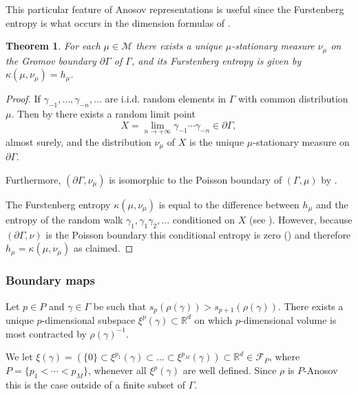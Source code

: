 \documentclass[10pt]{amsart}
\newtheorem{theorem}{Theorem}[section]
\newcommand{\R}{\mathbb{R}}
\newcommand{\F}{\mathcal{F}}
\newcommand{\M}{\mathcal M}
\let\g\gamma
\begin{document}
This particular feature of Anosov representations is useful since the Furstenberg entropy is what occurs in the dimension formulas of \cite{LL23}.


\begin{theorem}\label{furstenberg}
For each \(\mu \in \M\) there exists a unique \(\mu\)-stationary measure \(\nu_\mu\) on the Gromov boundary \(\partial \Gamma\) of \(\Gamma\), and its Furstenberg entropy is given by \(\kappa(\mu,\nu_\mu) = h_\mu\).
\end{theorem}
\begin{proof}
If \(\g_{-1},\ldots, \g_{-n},\ldots\) are i.i.d. random elements in \(\Gamma\) with common distribution \(\mu\). Then by \cite[Th.\,7.6]{Kai00} there exists a random limit point
\[
X = \lim_{n \to +\infty}\g_{-1}\cdots \g_{-n} \in \partial\Gamma,
\]
almost surely, and the distribution \(\nu_\mu\) of \(X\) is the unique \(\mu\)-stationary measure on \(\partial \Gamma\).

Furthermore, \((\partial \Gamma,\nu_\mu)\) is isomorphic to the Poisson boundary of \((\Gamma,\mu)\) by \cite[Th.\,7.7]{Kai00}.

The Furstenberg entropy \(\kappa(\mu,\nu_\mu)\) is equal to the difference between \(h_\mu\) and the entropy of the random walk \(\g_1, \g_1\g_2,\ldots\) conditioned on \(X\) (see \cite[Cor.\,2]{KV83}). However, because \((\partial \Gamma,\nu)\) is the Poisson boundary this conditional entropy is zero (\cite[Th.\,4.3 and 4.5]{Kai00}) and therefore \(h_\mu = \kappa(\mu,\nu_\mu)\) as claimed.
\end{proof}

\subsubsection{Boundary maps}

Let \(p \in P \) and \(\gamma \in \Gamma\) be such that \(s_p(\rho(\gamma)) > s_{p+1}(\rho(\gamma))\).
There exists a unique \(p\)-dimensional subspace \(\xi^p(\gamma) \subset \R^d\) on which \(p\)-dimensional volume is most contracted by \(\rho(\gamma)^{-1}\).

We let \(\xi(\gamma) = (\{0\} \!\subset\! \xi^{p_1}(\gamma) \!\subset\! \ldots \!\subset\! \xi^{p_{M}}(\gamma))\!\subset\! \R^d \in \F_P\), where \hbox{\(P = \lbrace p_1 < \cdots < p_{M} \rbrace\)}, whenever all \(\xi^p(\gamma)\) are well defined.
Since \(\rho\) is \(P\)-Anosov this is the case outside of a finite subset of \(\Gamma\).
\end{document}
